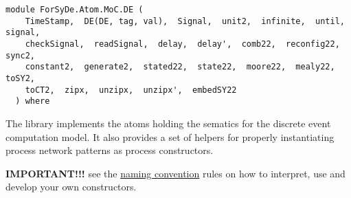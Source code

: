 \label{module:ForSyDe.Atom.MoC.DE}
\haddockbeginheader
{\haddockverb\begin{verbatim}
module ForSyDe.Atom.MoC.DE (
    TimeStamp,  DE(DE, tag, val),  Signal,  unit2,  infinite,  until,  signal, 
    checkSignal,  readSignal,  delay,  delay',  comb22,  reconfig22,  sync2, 
    constant2,  generate2,  stated22,  state22,  moore22,  mealy22,  toSY2, 
    toCT2,  zipx,  unzipx,  unzipx',  embedSY22
  ) where\end{verbatim}}
\haddockendheader

The  library implements the atoms holding the sematics for the
 discrete event computation model. It also provides a set of helpers
 for properly instantiating process network patterns as process
 constructors.\par
\textbf{IMPORTANT!!!}
 see the \href{ForSyDe-Atom.html#naming_conv}{naming convention} rules
 on how to interpret, use and develop your own constructors.\par

